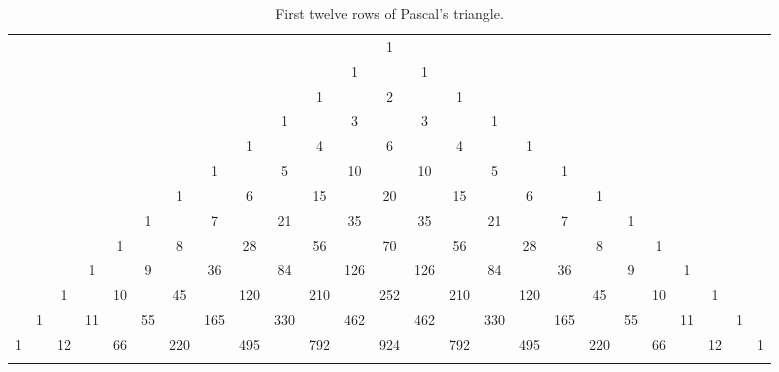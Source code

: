 \begin{enumerate}
\begin{table}[!htb]
\caption{First twelve rows of Pascal's triangle.}\label{tab:pascal12}
\begin{center}
\begin{sideways}%
\begin{tabular}{ccccccccccccccccccccccccc} 
& & & & & & & & & & & & 1\\
\noalign{\smallskip\smallskip} 
& & & & & & & & & & & 1 & & 1\\
\noalign{\smallskip\smallskip} 
& & & & & & & & & & 1 & & 2 & & 1\\
\noalign{\smallskip\smallskip} 
& & & & & & & & & 1 & & 3 & & 3 & & 1\\
\noalign{\smallskip\smallskip} 
& & & & & & & & 1 & & 4 & & 6 & & 4 & & 1\\
\noalign{\smallskip\smallskip} 
& & & & & & & 1 & & 5 & & 10 & & 10 & & 5 & & 1 \\
\noalign{\smallskip\smallskip} 
& & & & & & 1 & & 6 & & 15 & & 20 & & 15 & & 6 & & 1 \\
\noalign{\smallskip\smallskip} 
& & & & & 1 & & 7 & & 21 & & 35 & & 35 & & 21 & & 7 & & 1 \\
\noalign{\smallskip\smallskip} 
& & & & 1 & & 8 & & 28 & & 56 & & 70 & & 56 & & 28 & & 8 & & 1 \\
\noalign{\smallskip\smallskip} 
& & & 1 & & 9 & & 36 & & 84 & & 126 & & 126 & & 84 & & 36 & & 9 & & 1 \\
\noalign{\smallskip\smallskip} 
& & 1 & & 10 & & 45 & & 120 & & 210 & & 252 & & 210 & & 120 & & 45 & & 10 & & 1 \\
\noalign{\smallskip\smallskip} 
& 1 & & 11 & & 55 & & 165 & & 330 & & 462 & & 462 & & 330 & & 165 & & 55 & & 11 & & 1 \\
\noalign{\smallskip\smallskip} 
1 & & 12 & & 66 & & 220 & & 495 & & 792 & & 924 & & 792 & & 495 & & 220 & & 66 & & 12 & & 1 \\
\noalign{\smallskip\smallskip} 
\end{tabular}
\end{sideways}%
\end{center}
\end{table}



\end{enumerate}

